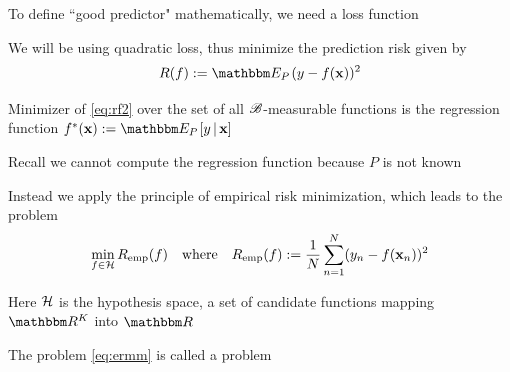 \begin{frame}
     
    \vspace{2em}
    To define ``good predictor" mathematically, we need a loss function
    
    We will be using quadratic loss, thus minimize
    the prediction risk given by
    \begin{equation}
        \label{eq:rf2}
        R(f) := \EEP  (y - f(\boldx))^2 
    \end{equation}
    
    \vspace{.7em}
    Minimizer of \eqref{eq:rf2} over the
    set of all $\mathscr B$-measurable functions is the regression
    function $f^*(\boldx) :=
    \EEP  [y \given \boldx]$
    
    Recall we cannot compute the regression function because $P$ is not known 
    
\end{frame}

\begin{frame}

    \vspace{2em}
    Instead we apply the principle of empirical risk minimization,
    which leads to the problem
    \begin{equation}
        \label{eq:ermm}
        \min_{f \in \mathcal H} R_{{\rm emp}}(f)
        \quad \text{where} \quad
        R_{{\rm emp}}(f) := \frac{1}{N} \sum_{n=1}^N (y_n - f({\mathbf x}_n))^2
    \end{equation}
    
    \vspace{.7em}
    Here $\mathcal H$ is the hypothesis space, a set of candidate functions 
    mapping $\RR^K$ into $\RR$
    
    The problem \eqref{eq:ermm} is
    called a  problem
  
\end{frame}

